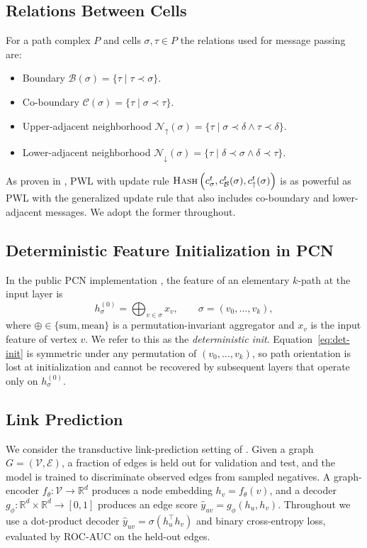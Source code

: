 \documentclass[letterpaper]{article} %
\begin{document}
\subsection{Relations Between Cells} \label{subsec:relations}
For a path complex \(P\) and cells \(\sigma, \tau \in P\) the relations used for message passing are:
\begin{itemize}
    \item Boundary \(\mathcal{B}(\sigma) = \{\tau \mid \tau \prec \sigma\}\).
    \item Co-boundary \(\mathcal{C}(\sigma) = \{\tau \mid \sigma \prec \tau\}\).
    \item Upper-adjacent neighborhood \(\mathcal{N}_\uparrow(\sigma) = \{\tau \mid \sigma \prec \delta \wedge \tau \prec \delta\}\).
    \item Lower-adjacent neighborhood \(\mathcal{N}_\downarrow(\sigma) = \{\tau \mid \delta \prec \sigma \wedge \delta \prec \tau\}\).
\end{itemize}
As proven in \cite{truong_weisfeiler_2024}, PWL with update rule \(\textsc{Hash}\left(c_\sigma^t, c_\mathcal{B}^t(\sigma), c_\uparrow^t(\sigma)\right)\) is as powerful as PWL with the generalized update rule that also includes co-boundary and lower-adjacent messages. We adopt the former throughout.

\subsection{Deterministic Feature Initialization in PCN} \label{subsec:det-init}
In the public PCN implementation \cite{truong_weisfeiler_2024}, the feature of an elementary \(k\)-path at the input layer is
\begin{equation}
    h_\sigma^{(0)} = \bigoplus_{v \in \sigma} x_v, \qquad \sigma = (v_0, \ldots, v_k), \label{eq:det-init}
\end{equation}
where \(\oplus \in \{\text{sum}, \text{mean}\}\) is a permutation-invariant aggregator and \(x_v\) is the input feature of vertex \(v\). We refer to this as the \emph{deterministic init}. Equation~\eqref{eq:det-init} is symmetric under any permutation of \((v_0, \ldots, v_k)\), so path orientation is lost at initialization and cannot be recovered by subsequent layers that operate only on \(h_\sigma^{(0)}\).

\subsection{Link Prediction} \label{subsec:lp}
We consider the transductive link-prediction setting of \cite{kipf_variational_2016}. Given a graph \(G = (\mathcal{V}, \mathcal{E})\), a fraction of edges is held out for validation and test, and the model is trained to discriminate observed edges from sampled negatives. A graph-encoder \(f_\theta: \mathcal{V} \to \mathbb{R}^d\) produces a node embedding \(h_v = f_\theta(v)\), and a decoder \(g_\phi: \mathbb{R}^d \times \mathbb{R}^d \to [0, 1]\) produces an edge score \(\hat{y}_{uv} = g_\phi(h_u, h_v)\). Throughout we use a dot-product decoder \(\hat{y}_{uv} = \sigma(h_u^\top h_v)\) and binary cross-entropy loss, evaluated by ROC-AUC on the held-out edges.
\end{document}
